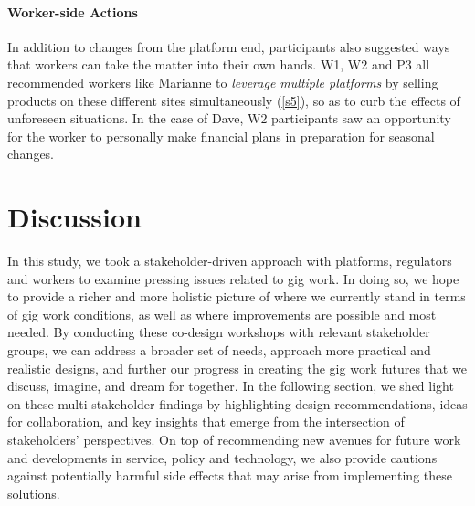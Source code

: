 \paragraph{Worker-side Actions}
In addition to changes from the platform end, participants also suggested ways that workers can take the matter into their own hands. W1, W2 and P3 all recommended workers like Marianne to \textit{leverage multiple platforms} by selling products on these different sites simultaneously (\ref{s5}), so as to curb the effects of unforeseen situations. In the case of Dave, W2 participants saw an opportunity for the worker to personally make financial plans in preparation for seasonal changes.

\section{Discussion}
In this study, we took a stakeholder-driven approach with platforms, regulators and workers to examine pressing issues related to gig work. 
In doing so, we hope to provide a richer and more holistic picture of where we currently stand in terms of gig work conditions, as well as where improvements are possible and most needed.
By conducting these co-design workshops with relevant stakeholder groups, we can address a broader set of needs, approach more practical and realistic designs, and further our progress in creating the gig work futures that we discuss, imagine, and dream for together. 
In the following section, we shed light on these multi-stakeholder findings by highlighting design recommendations, ideas for collaboration, and key insights that emerge from the intersection of stakeholders' perspectives. 
On top of recommending new avenues for future work and developments in service, policy and technology, we also provide cautions against potentially harmful side effects that may arise from implementing these solutions.
